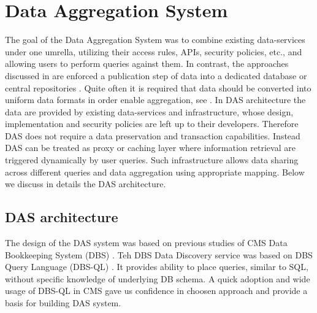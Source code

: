 \documentclass[1p,times]{elsarticle}
\begin{document}
\section{Data Aggregation System\label{DAS}}
The goal of the Data Aggregation System was to combine existing data-services
under one umrella, utilizing their access rules, APIs, security policies, etc., and
allowing users to perform queries against them. In contrast, the approaches
discussed in \cite{DBXplorer, QueryAnswer, FedDB} are
enforced a publication step of data into a dedicated database 
or central repositories \cite{iRODS}. Quite often it is required
that data should be converted into uniform data formats in order enable
aggregation, see \cite{OpenArchive}. In DAS architecture the data are provided
by existing data-services and infrastructure, whose design, implementation and
security policies are left up to their developers. Therefore DAS does not require
a data preservation and transaction capabilities. Instead DAS can be treated
as proxy or caching layer where information retrieval are triggered dynamically
by user queries. Such infrastructure allows data sharing across different queries and
data aggregation using appropriate mapping. Below we discuss in details the
DAS architecture.

\subsection{DAS architecture}
The design of the DAS system was based on previous studies of CMS Data 
Bookkeeping System (DBS) \cite{DBS, DBS07}. Teh DBS Data Discovery service
\cite{DD} was based on DBS Query Language (DBS-QL) \cite{DBS-QL}. It provides
ability to place queries, similar to SQL, without specific knowledge of 
underlying DB schema.
A quick adoption and wide usage of DBS-QL in CMS gave us confidence in choosen approach 
and provide a basis for building DAS system.
\end{document}
